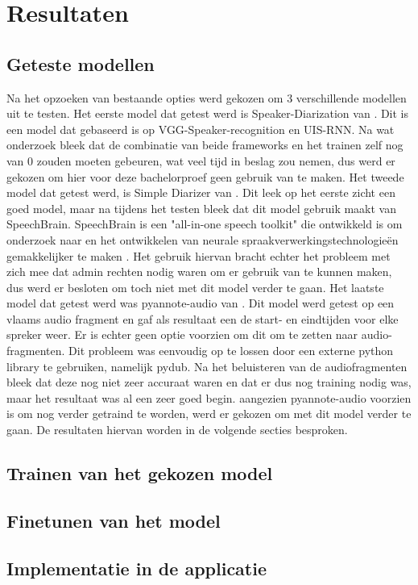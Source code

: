 
\chapter{Resultaten}%
\label{ch:resultaten}

\section{Geteste modellen}
\label{sec:modellen}
Na het opzoeken van bestaande opties werd gekozen om 3 verschillende modellen uit te testen. Het eerste model dat getest werd is Speaker-Diarization van \textcite{DongLu}. Dit is een model dat gebaseerd is op VGG-Speaker-recognition en UIS-RNN. Na wat onderzoek bleek dat de combinatie van beide frameworks en het trainen zelf nog van 0 zouden moeten gebeuren, wat veel tijd in beslag zou nemen, dus werd er gekozen om hier voor deze bachelorproef geen gebruik van te maken.
Het tweede model dat getest werd, is Simple Diarizer van \textcite{Chau}. Dit leek op het eerste zicht een goed model, maar na tijdens het testen bleek dat dit model gebruik maakt van SpeechBrain. SpeechBrain is een "all-in-one speech toolkit" die ontwikkeld is om onderzoek naar en het ontwikkelen van neurale spraakverwerkingstechnologieën gemakkelijker te maken \autocite{speechbrain}. Het gebruik hiervan bracht echter het probleem met zich mee dat admin rechten nodig waren om er gebruik van te kunnen maken, dus werd er besloten om toch niet met dit model verder te gaan.
Het laatste model dat getest werd was pyannote-audio van \textcite{Bredin2024}. Dit model werd getest op een vlaams audio fragment en gaf als resultaat een de start- en eindtijden voor elke spreker weer. Er is echter geen optie voorzien om dit om te zetten naar audio-fragmenten. Dit probleem was eenvoudig op te lossen door een externe python library te gebruiken, namelijk pydub. Na het beluisteren van de audiofragmenten bleek dat deze nog niet zeer accuraat waren en dat er dus nog training nodig was, maar het resultaat was al een zeer goed begin. aangezien pyannote-audio voorzien is om nog verder getraind te worden, werd er gekozen om met dit model verder te gaan. De resultaten hiervan worden in de volgende secties besproken.

\section{Trainen van het gekozen model}
\label{sec:trainen}


\section{Finetunen van het model}
\label{sec:finetunen}


\section{Implementatie in de applicatie}
\label{sec:implementatie}
